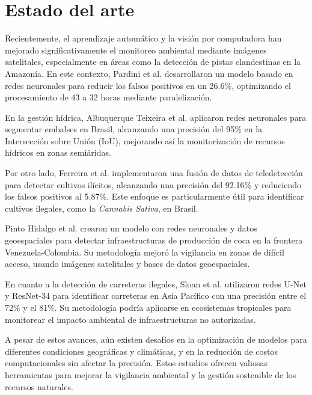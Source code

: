 \section{Estado del arte}

Recientemente, el aprendizaje automático y la visión por computadora han mejorado significativamente el monitoreo ambiental mediante imágenes satelitales, especialmente en áreas como la detección de pistas clandestinas en la Amazonía. En este contexto, Pardini et al. \cite{pardini2025} desarrollaron un modelo basado en redes neuronales para reducir los falsos positivos en un 26.6\%, optimizando el procesamiento de 43 a 32 horas mediante paralelización.

En la gestión hídrica, Albuquerque Teixeira et al. \cite{albuquerque2024} aplicaron redes neuronales para segmentar embalses en Brasil, alcanzando una precisión del 95\% en la Intersección sobre Unión (IoU), mejorando así la monitorización de recursos hídricos en zonas semiáridas.

Por otro lado, Ferreira et al. \cite{ferreira2019} implementaron una fusión de datos de teledetección para detectar cultivos ilícitos, alcanzando una precisión del 92.16\% y reduciendo los falsos positivos al 5.87\%. Este enfoque es particularmente útil para identificar cultivos ilegales, como la \textit{Cannabis Sativa}, en Brasil.

Pinto Hidalgo et al. \cite{pinto2023} crearon un modelo con redes neuronales y datos geoespaciales para detectar infraestructuras de producción de coca en la frontera Venezuela-Colombia. Su metodología mejoró la vigilancia en zonas de difícil acceso, usando imágenes satelitales y bases de datos geoespaciales.

En cuanto a la detección de carreteras ilegales, Sloan et al. \cite{sloan2024} utilizaron redes U-Net y ResNet-34 para identificar carreteras en Asia Pacífico con una precisión entre el 72\% y el 81\%. Su metodología podría aplicarse en ecosistemas tropicales para monitorear el impacto ambiental de infraestructuras no autorizadas.

A pesar de estos avances, aún existen desafíos en la optimización de modelos para diferentes condiciones geográficas y climáticas, y en la reducción de costos computacionales sin afectar la precisión. Estos estudios ofrecen valiosas herramientas para mejorar la vigilancia ambiental y la gestión sostenible de los recursos naturales.

